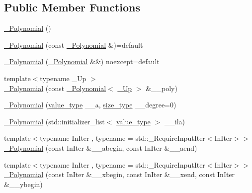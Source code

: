 \subsection*{Public Member Functions}
\begin{DoxyCompactItemize}
\item 
\hyperlink{class____gnu__cxx_1_1__Polynomial_ad2baf4c12b7e3ab131a592afa3f391ae}{\+\_\+\+Polynomial} ()
\item 
\hyperlink{class____gnu__cxx_1_1__Polynomial_ac0a657bc804f3db8a03acfd1b98abb39}{\+\_\+\+Polynomial} (const \hyperlink{class____gnu__cxx_1_1__Polynomial}{\+\_\+\+Polynomial} \&)=default
\item 
\hyperlink{class____gnu__cxx_1_1__Polynomial_a87bad90934c9752b51cdece15a5b369f}{\+\_\+\+Polynomial} (\hyperlink{class____gnu__cxx_1_1__Polynomial}{\+\_\+\+Polynomial} \&\&) noexcept=default
\item 
{\footnotesize template$<$typename \+\_\+\+Up $>$ }\\\hyperlink{class____gnu__cxx_1_1__Polynomial_ae744374b972b91a9609ba6cc1330bbfd}{\+\_\+\+Polynomial} (const \hyperlink{class____gnu__cxx_1_1__Polynomial}{\+\_\+\+Polynomial}$<$ \hyperlink{class____gnu__cxx_1_1__Polynomial_a242114d4b86648a5dff67a8221f80d40}{\+\_\+\+Up} $>$ \&\+\_\+\+\_\+poly)
\item 
\hyperlink{class____gnu__cxx_1_1__Polynomial_ad89b416fedd4e3a23b484d5269767a93}{\+\_\+\+Polynomial} (\hyperlink{class____gnu__cxx_1_1__Polynomial_a725563351f50e76084a7a016c06f8a53}{value\+\_\+type} \+\_\+\+\_\+a, \hyperlink{class____gnu__cxx_1_1__Polynomial_a8b25fcfd4acaad0c5c08b649c22da28a}{size\+\_\+type} \+\_\+\+\_\+degree=0)
\item 
\hyperlink{class____gnu__cxx_1_1__Polynomial_acc6b7b2a52600f62bf8dee99f2fb787c}{\+\_\+\+Polynomial} (std\+::initializer\+\_\+list$<$ \hyperlink{class____gnu__cxx_1_1__Polynomial_a725563351f50e76084a7a016c06f8a53}{value\+\_\+type} $>$ \+\_\+\+\_\+ila)
\item 
{\footnotesize template$<$typename In\+Iter , typename  = std\+::\+\_\+\+Require\+Input\+Iter$<$\+In\+Iter$>$$>$ }\\\hyperlink{class____gnu__cxx_1_1__Polynomial_a45589d1d036861179488c44f3029f335}{\+\_\+\+Polynomial} (const In\+Iter \&\+\_\+\+\_\+abegin, const In\+Iter \&\+\_\+\+\_\+aend)
\item 
{\footnotesize template$<$typename In\+Iter , typename  = std\+::\+\_\+\+Require\+Input\+Iter$<$\+In\+Iter$>$$>$ }\\\hyperlink{class____gnu__cxx_1_1__Polynomial_a86249f53e97e72eff11242a8ba85ba4c}{\+\_\+\+Polynomial} (const In\+Iter \&\+\_\+\+\_\+xbegin, const In\+Iter \&\+\_\+\+\_\+xend, const In\+Iter \&\+\_\+\+\_\+ybegin)

\end{DoxyCompactItemize}
